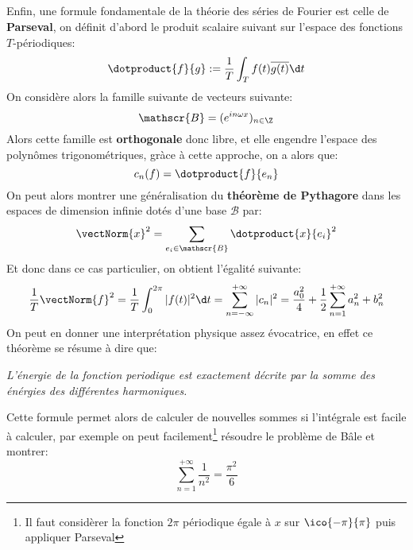 \subsection*{}
Enfin, une formule fondamentale de la théorie des séries de Fourier est celle de \textbf{Parseval}, on définit d'abord le produit scalaire suivant sur l'espace des fonctions \(T\)-périodiques:
\[
   \dotproduct{f}{g} := \frac{1}{T}\int_T f(t)\overline{g(t)} \d t   
\]
On considère alors la famille suivante de vecteurs suivante:
\[
   \mathscr{B} = (e^{in\omega x})_{n \in \Z}
\]
Alors cette famille est \textbf{orthogonale} donc libre, et elle engendre l'espace des polynômes trigonométriques, gràce à cette approche, on a alors que:
\[
   c_n(f) = \dotproduct{f}{e_n}
\]
On peut alors montrer une généralisation du \textbf{théorème de Pythagore} dans les espaces de dimension infinie dotés d'une base \(\mathscr{B}\) par:
\[
   \vectNorm{x}^2 = \sum_{e_i \in \mathscr{B}}\dotproduct{x}{e_i}^2
\]
Et donc dans ce cas particulier, on obtient l'égalité suivante:
\[
   \frac{1}{T} \vectNorm{f}^2 = \frac{1}{T} \int_{0}^{2\pi} |f(t)|^2 \d t = \sum_{n=-\infty}^{+\infty} |c_n|^2 = \frac{a_0^2}{4} + \frac{1}{2} \sum_{n=1}^{+\infty} a_n^2 + b_n^2
\]
On peut en donner une interprétation physique assez évocatrice, en effet ce théorème se résume à dire que:
\begin{center}
   \textit{L'énergie de la fonction periodique est exactement décrite par la somme des énérgies des différentes harmoniques.}
\end{center}
Cette formule permet alors de calculer de nouvelles sommes si l'intégrale est facile à calculer, par exemple on peut facilement\footnote[1]{Il faut considèrer la fonction \(2\pi\) périodique égale à \(x\) sur \(\ico{-\pi}{\pi}\) puis appliquer Parseval} résoudre le problème de Bâle et montrer:
\[
   \sum_{n=1}^{+\infty}\frac{1}{n^2} = \frac{\pi^2}{6}   
\]
\pagebreak

